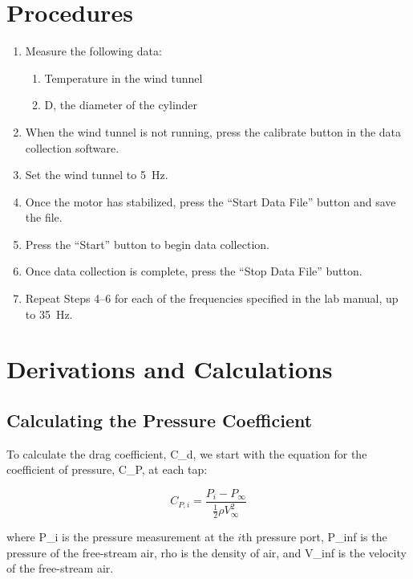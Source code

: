 \section{Procedures}\label{sec:procedures}

\begin{enumerate}
    \item Measure the following data:
    \begin{enumerate}
        \item Temperature in the wind tunnel
        \item \gls{D}, the diameter of the cylinder
    \end{enumerate}
    \item When the wind tunnel is not running, press the calibrate button in the data collection software.
    \item Set the wind tunnel to \qty{5}{\hertz}.
    \item Once the motor has stabilized, press the ``Start Data File'' button and save the file. 
    \item Press the ``Start'' button to begin data collection. 
    \item Once data collection is complete, press the ``Stop Data File'' button.
    \item Repeat Steps \numrange{4}{6} for each of the frequencies specified in the lab manual, up to \qty{35}{\hertz}.
\end{enumerate}
\newpage

\section{Derivations and Calculations}

\subsection{Calculating the Pressure Coefficient}

To calculate the drag coefficient, \gls{C_d}, we start with the equation for the coefficient of pressure, \gls{C_P}, at each tap:

\begin{equation}\label{eq:pressurecoeff_1}
    C_{P,i} = \frac{P_i - P_\infty}{\frac{1}{2} \rho V_\infty^2}
\end{equation}

\noindent{}where \gls{P_i} is the pressure measurement at the $i$th pressure port, \gls{P_inf} is the pressure of the free-stream air, \gls{rho} is the density of air, and \gls{V_inf} is the velocity of the free-stream air.

